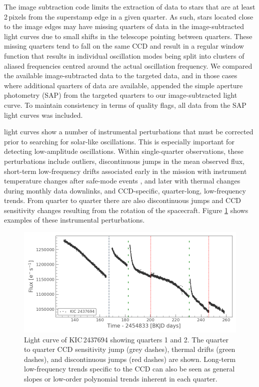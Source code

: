 The image subtraction code limits the extraction of data to stars that are at least 2\,pixels from the superstamp edge in a given quarter. As such, stars located close to the image edges may have missing quarters of data in the image-subtracted light curves due to small shifts in the telescope pointing between quarters. These missing quarters tend to fall on the same CCD and result in a regular window function that results in individual oscillation modes being split into clusters of aliased frequencies centred around the actual oscillation frequency. We compared the available image-subtracted data to the \Kepler{} targeted data, and in those cases where additional quarters of data are available, appended the simple aperture photometry (SAP) from the targeted quarters to our image-subtracted light curve. To maintain consistency in terms of quality flags, all data from the SAP light curves was included.

\Kepler{} light curves show a number of instrumental perturbations that must be corrected prior to searching for solar-like oscillations. This is especially important for detecting low-amplitude oscillations. Within single-quarter observations, these perturbations include outliers, discontinuous jumps in the mean observed flux, short-term low-frequency drifts associated early in the mission with instrument temperature changes after safe-mode events \citep{garcia_preparation_2011}, and later with thermal changes during monthly data downlinks, and CCD-specific, quarter-long, low-frequency trends. From quarter to quarter there are also discontinuous jumps and CCD sensitivity changes resulting from the rotation of the \Kepler{} spacecraft. Figure \ref{fig:lc_system} shows examples of these instrumental perturbations. 

\begin{figure}
    \centering
    \includegraphics[width=\linewidth]{Chapter5/lc12_systematics.png}
    \caption[Light curve of KIC 2437694 showing quarters 1 and 2]{Light curve of KIC\,2437694 showing quarters 1 and 2. The quarter to quarter CCD sensitivity jump (grey dashes), thermal drifts (green dashes), and discontinuous jumps (red dashes) are shown. Long-term low-frequency trends specific to the CCD can also be seen as general slopes or low-order polynomial trends inherent in each quarter.}
    \label{fig:lc_system}
\end{figure}

